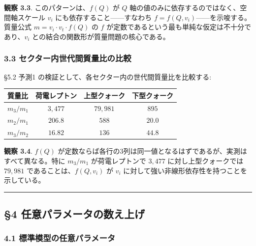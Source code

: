 \documentclass[
  a4paper,11pt]{ltjsarticle}
\newcounter{none} %
\begin{document}
\textbf{観察 3.3}. このパターンは、\(f(Q)\) が \(Q\)
軸の値のみに依存するのではなく、空間軸スケール \(v_i\)
にも依存すること------すなわち
\(f = f(Q, v_i)\)------を示唆する。質量公式
\(m = v_i \cdot v_t \cdot f(Q)\) の \(f\)
が定数であるという最も単純な仮定は不十分であり、\(v_i\)
との結合の関数形が質量問題の核心である。

\subsubsection{3.3
セクター内世代間質量比の比較}\label{ux30bbux30afux30bfux30fcux5185ux4e16ux4ee3ux9593ux8ceaux91cfux6bd4ux306eux6bd4ux8f03}

§5.2 予測1 の検証として、各セクター内の世代間質量比を比較する:

{\def\LTcaptype{none} %
\begin{longtable}[]{@{}lccc@{}}
\toprule\noalign{}
質量比 & 荷電レプトン & 上型クォーク & 下型クォーク \\
\midrule\noalign{}
\endhead
\bottomrule\noalign{}
\endlastfoot
\(m_3 / m_1\) & \(3{,}477\) & \(79{,}981\) & \(895\) \\
\(m_2 / m_1\) & \(206.8\) & \(588\) & \(20.0\) \\
\(m_3 / m_2\) & \(16.82\) & \(136\) & \(44.8\) \\
\end{longtable}
}

\textbf{観察 3.4}. \(f(Q)\)
が定数ならば各行の3列は同一値となるはずであるが、実測はすべて異なる。特に
\(m_3/m_1\) が荷電レプトンで \(3{,}477\) に対し上型クォークでは
\(79{,}981\) であることは、\(f(Q, v_i)\) が \(v_i\)
に対して強い非線形依存性を持つことを示している。

\begin{center}\rule{0.5\linewidth}{0.5pt}\end{center}

\subsection{§4
任意パラメータの数え上げ}\label{ux4efbux610fux30d1ux30e9ux30e1ux30fcux30bfux306eux6570ux3048ux4e0aux3052}

\subsubsection{4.1
標準模型の任意パラメータ}\label{ux6a19ux6e96ux6a21ux578bux306eux4efbux610fux30d1ux30e9ux30e1ux30fcux30bf}
\end{document}
